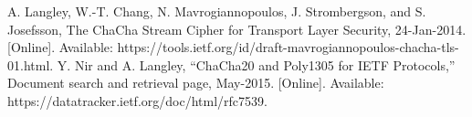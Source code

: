 \documentclass[conference]{IEEEtran}
\begin{document}
\begin{thebibliography}{00}
 A. Langley, W.-T. Chang, N. Mavrogiannopoulos, J. Strombergson, and S. Josefsson, The ChaCha Stream Cipher for Transport Layer Security, 24-Jan-2014. [Online]. Available: https://tools.ietf.org/id/draft-mavrogiannopoulos-chacha-tls-01.html.
 Y. Nir and A. Langley, “ChaCha20 and Poly1305 for IETF Protocols,” Document search and retrieval page, May-2015. [Online]. Available: https://datatracker.ietf.org/doc/html/rfc7539.
\end{thebibliography}
\vspace{12pt}
\end{document}
